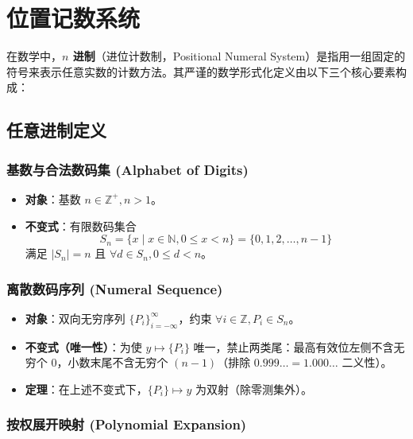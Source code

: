 \clearpage
\begingroup
\let\clearpage\relax
\let\cleardoublepage\relax
\vspace*{\fill}
\chapter{位置记数系统}
\begin{center}
在数学中，\textbf{$n$ 进制}（进位计数制，Positional Numeral System）是指用一组固定的符号来表示任意实数的计数方法。其严谨的数学形式化定义由以下三个核心要素构成：
\end{center}
\vspace*{\fill}
\endgroup
\clearpage


\section{任意进制定义}

\subsection{基数与合法数码集 (Alphabet of Digits)}

\begin{itemize}
    \item \textbf{对象}：基数 $n \in \mathbb{Z}^+, n > 1$。
    \item \textbf{不变式}：有限数码集合
$$S_n = \{ x \mid x \in \mathbb{N}, 0 \leq x < n \} = \{0, 1, 2, \dots, n-1\}$$
满足 $|S_n| = n$ 且 $\forall d \in S_n, 0 \le d < n$。
\end{itemize}

\subsection{离散数码序列 (Numeral Sequence)}

\begin{itemize}
    \item \textbf{对象}：双向无穷序列 $\{P_i\}_{i=-\infty}^{\infty}$，约束 $\forall i \in \mathbb{Z}, P_i \in S_n$。
    \item \textbf{不变式（唯一性）}：为使 $y \mapsto \{P_i\}$ 唯一，禁止两类尾：最高有效位左侧不含无穷个 $0$，小数末尾不含无穷个 $(n-1)$（排除 $0.999\ldots = 1.000\ldots$ 二义性）。
    \item \textbf{定理}：在上述不变式下，$\{P_i\} \mapsto y$ 为双射（除零测集外）。
\end{itemize}

\subsection{按权展开映射 (Polynomial Expansion)}

